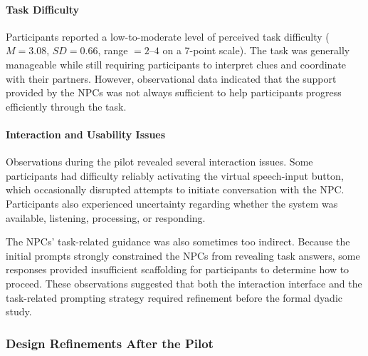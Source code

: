 \documentclass[a4paper,fleqn]{cas-sc}
\begin{document}
\paragraph{Task Difficulty}

Participants reported a low-to-moderate level of perceived task difficulty ($M=3.08$, $SD=0.66$, range $=2$--$4$ on a 7-point scale). The task was generally manageable while still requiring participants to interpret clues and coordinate with their partners. However, observational data indicated that the support provided by the NPCs was not always sufficient to help participants progress efficiently through the task.

\paragraph{Interaction and Usability Issues}

Observations during the pilot revealed several interaction issues. Some participants had difficulty reliably activating the virtual speech-input button, which occasionally disrupted attempts to initiate conversation with the NPC. Participants also experienced uncertainty regarding whether the system was available, listening, processing, or responding.

The NPCs' task-related guidance was also sometimes too indirect. Because the initial prompts strongly constrained the NPCs from revealing task answers, some responses provided insufficient scaffolding for participants to determine how to proceed. These observations suggested that both the interaction interface and the task-related prompting strategy required refinement before the formal dyadic study.

\subsubsection{Design Refinements After the Pilot}
\label{sec:refinements}
\end{document}
